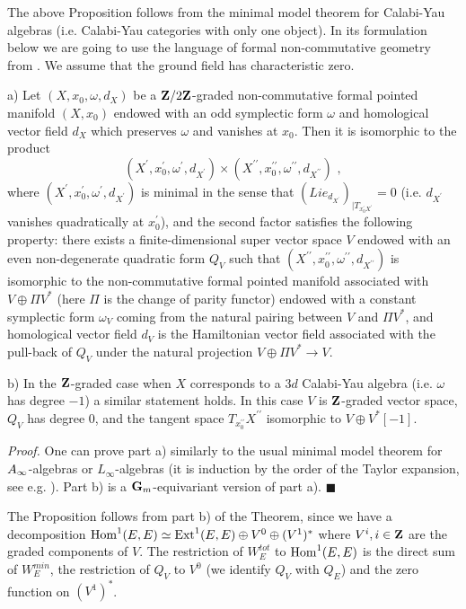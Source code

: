 \documentclass[12pt]{article}
\begin{document}
The above Proposition follows from the minimal model theorem for Calabi-Yau algebras (i.e. Calabi-Yau categories with only one object). In its formulation below we are going to use the language of formal non-commutative geometry from \cite{KoSo3}. We assume that the ground field has characteristic zero.

\begin{thm} a) Let $(X,x_0,\omega,d_X)$ be a ${\bf Z}/2{\bf Z}$-graded non-commutative formal pointed manifold $(X,x_0)$ endowed with an odd symplectic form $\omega$ and homological vector field $d_X$ which preserves $\omega$ and vanishes at $x_0$. Then it is isomorphic to the product
$$(X^{\prime}, x_0^{\prime},\omega^{\prime}, d_{X^{\prime}})\times (X^{\prime\prime}, x_0^{\prime\prime},\omega^{\prime\prime}, d_{X^{\prime\prime}})\,\,,$$
 where
$(X^{\prime}, x_0^{\prime},\omega^{\prime}, d_{X^{\prime}})$ is minimal in the sense that
$(Lie_{d_{X^{\prime}}})_{|T_{x_0^{\prime}X^{\prime}}}=0$ (i.e. $d_{X^{\prime}}$ vanishes quadratically at $x_0^{\prime}$),
and the second factor satisfies the following property:
there exists a finite-dimensional super vector space $V$ endowed with an even non-degenerate quadratic form $Q_V$ such that $(X^{\prime\prime}, x_0^{\prime\prime},\omega^{\prime\prime}, d_{X^{\prime\prime}})$ is isomorphic to the non-commutative formal pointed manifold associated with $V\oplus \Pi V^{\ast}$ (here $\Pi$ is the change of parity functor) endowed with a constant symplectic form $\omega_V$ coming from the natural pairing between $V$ and
$\Pi V^{\ast}$, and homological vector field $d_V$ is the Hamiltonian vector field associated with the pull-back of $Q_V$ under the natural projection $V\oplus \Pi V^{\ast}\to V$.


b) In the ${\bf Z}$-graded case when $X$ corresponds to a $3d$ Calabi-Yau algebra (i.e. $\omega$ has degree $-1$) a similar statement holds. In this case $V$ is ${\bf Z}$-graded vector space, $Q_V$ has degree $0$, and the tangent space $T_{x_0^{\prime\prime}}X^{\prime\prime}$ isomorphic to $V\oplus V^{\ast}[-1]$.
\end{thm}

{\it Proof.} One can prove  part a) similarly to the usual minimal model theorem for $A_{\infty}$-algebras or $L_{\infty}$-algebras (it is induction by the order of the Taylor expansion, see e.g. \cite{KoSo2}). Part b) is a ${\bf G}_m$-equivariant version of part a). $\blacksquare$


The Proposition follows from part b) of the Theorem, since we have a decomposition
$\operatorname{Hom}^1(E,E)\simeq \operatorname{Ext}^1(E,E)\oplus V^0\oplus (V^1)^{\ast}$ where $V^i,i\in {\bf Z}$ are the graded components of $V$. The restriction of $W^{tot}_E$ to $\operatorname{Hom}^1(E,E)$ is the direct sum of $W_E^{min}$, the restriction of $Q_V$ to $V^0$ (we identify $Q_V$ with $Q_E$) and the zero function on $(V^1)^{\ast}$.
\end{document}
